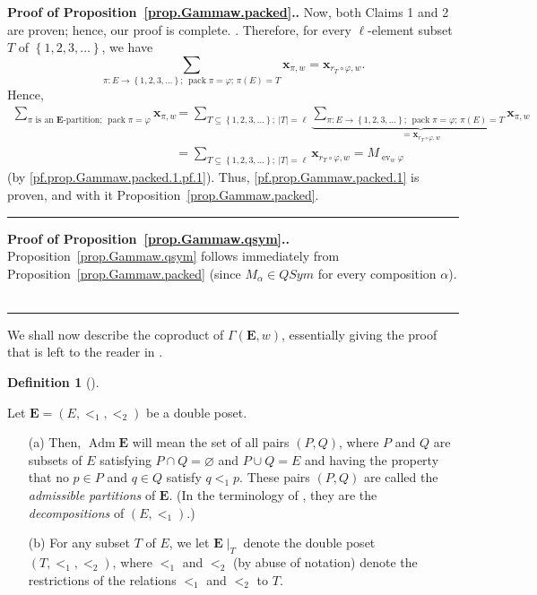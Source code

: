 \documentclass[numbers=enddot,12pt,final,onecolumn,notitlepage,abstracton]{scrartcl}%
\theoremstyle{definition}
\newtheorem{defi}[theo]{Definition}
\newenvironment{definition}[1][]
{\begin{defi}[#1]\begin{leftbar}}
{\end{leftbar}\end{defi}}
\newenvironment{proof}[1][Proof]{\noindent\textbf{#1.} }{\ \rule{0.5em}{0.5em}}
\let\sumnonlimits\sum
\renewcommand{\sum}{\sumnonlimits\limits}
\newcommand{\xx}{{\mathbf{x}}}
\newcommand{\ev}{\operatorname{ev}}
\newcommand{\Adm}{\operatorname{Adm}}
\newcommand{\pack}{\operatorname{pack}}
\newcommand{\EE}{{\mathbf{E}}}
\begin{document}
\begin{proof}[Proof of Proposition~\ref{prop.Gammaw.packed}.]
{Now, both Claims 1 and 2 are proven; hence, our proof is complete.
}. Therefore, for every $\ell$-element subset $T$ of
$\left\{1, 2, 3, \ldots\right\}$, we have
\[
\sum_{\pi : E \to \left\{1, 2, 3, \ldots\right\} \text{; } \pack \pi = \varphi
\text{; } \pi\left(E\right) = T}
\xx_{\pi, w}
= \xx_{r_T\circ\varphi,w} .
\]
Hence,
\begin{align*}
\sum_{\pi\text{ is an }\EE\text{-partition; } \pack \pi = \varphi}
\xx_{\pi, w}
&= \sum_{T \subseteq \left\{1, 2, 3, \ldots\right\} ; \ \left|T\right| = \ell}
\underbrace{\sum_{\pi : E \to \left\{1, 2, 3, \ldots\right\} \text{; } \pack \pi = \varphi
\text{; } \pi\left(E\right) = T}
\xx_{\pi, w}}_{= \xx_{r_T\circ\varphi,w}} \\
&= \sum_{T \subseteq \left\{1, 2, 3, \ldots\right\} ; \ \left|T\right| = \ell}
\xx_{r_T\circ\varphi,w}
= M_{\ev_w \varphi}
\end{align*}
(by \eqref{pf.prop.Gammaw.packed.1.pf.1}).
Thus, \eqref{pf.prop.Gammaw.packed.1}
is proven, and with it Proposition~\ref{prop.Gammaw.packed}.
\end{proof}

\begin{proof}[Proof of Proposition~\ref{prop.Gammaw.qsym}.]
Proposition~\ref{prop.Gammaw.qsym} follows immediately from
Proposition~\ref{prop.Gammaw.packed}
(since $M_\alpha \in QSym$ for every composition $\alpha$).
\end{proof}

We shall now describe the coproduct of $\Gamma\left(\EE, w\right)$,
essentially giving the proof that is left to the reader in
\cite[Theorem 2.2]{Mal-Reu-DP}.

\begin{definition}
Let $\EE = \left(E, <_1, <_2\right)$ be a double poset.

\begin{itemize}

\item[(a)]
Then, $\Adm \EE$ will mean the set of all pairs
$\left(P, Q\right)$, where $P$ and $Q$ are subsets of $E$ satisfying
$P \cap Q = \varnothing$ and $P \cup Q = E$ and having the property
that no $p \in P$ and $q \in Q$ satisfy $q <_1 p$. These pairs
$\left(P, Q\right)$ are
called the \textit{admissible partitions} of $\EE$. (In the
terminology of \cite{Mal-Reu-DP}, they are the
\textit{decompositions} of $\left(E, <_1\right)$.)

\item[(b)] For
any subset $T$ of $E$, we let $\EE\mid_T$ denote the double poset
$\left(T, <_1, <_2\right)$, where $<_1$ and $<_2$ (by abuse of
notation) denote the restrictions of the relations $<_1$ and $<_2$
to $T$.

\end{itemize}
\end{definition}
\end{document}

